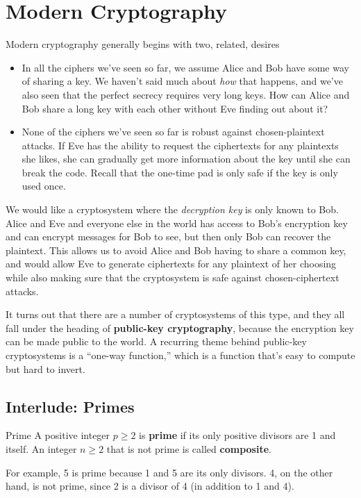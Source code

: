 \documentclass[letterpaper]{article}
\begin{document}
\section{Modern Cryptography}
Modern cryptography generally begins with two, related, desires 
\begin{itemize}
    \item In all the ciphers we've seen so far, we assume Alice and Bob have some way of sharing a key. We haven't said much about \emph{how} that happens, and we've also seen that the perfect secrecy requires very long keys. How can Alice and Bob share a long key with each other without Eve finding out about it? 
    \item None of the ciphers we've seen so far is robust against chosen-plaintext attacks. If Eve has the ability to request the ciphertexts for any plaintexts she likes, she can gradually get more information about the key until she can break the code. Recall that the one-time pad is only safe if the key is only used once. 
\end{itemize}
We would like a cryptosystem where the \emph{decryption key} is only known to Bob. Alice and Eve and everyone else in the world has access to Bob's encryption key and can encrypt messages for Bob to see, but then only Bob can recover the plaintext. This allows us to avoid Alice and Bob having to share a common key, and would allow Eve to generate ciphertexts for any plaintext of her choosing while also making sure that the cryptosystem is safe against chosen-ciphertext attacks. 

\bigskip 

It turns out that there are a number of cryptosystems of this type, and they all fall under the heading of \textbf{public-key cryptography}, because the encryption key can be made public to the world. A recurring theme behind public-key cryptosystems is a ``one-way function,'' which is a function that's easy to compute but hard to invert. 

\subsection{Interlude: Primes} 
\begin{definition}{Prime}{}
    A positive integer $p \geq 2$ is \textbf{prime} if its only positive divisors are 1 and itself. An integer $n \geq 2$ that is not prime is called \textbf{composite}.
\end{definition}
For example, 5 is prime because 1 and 5 are its only divisors. 4, on the other hand, is not prime, since 2 is a divisor of 4 (in addition to 1 and 4). 
\end{document}
